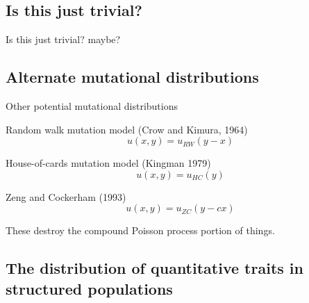 \documentclass{beamer}
\begin{document}
\subsection{Is this just trivial?}

\begin{frame}{Is this just trivial?}
  maybe?
\end{frame}

\subsection{Alternate mutational distributions}

\begin{frame}{Other potential mutational distributions}
  \begin{block}{Random walk mutation model (Crow and Kimura, 1964)}
    \begin{equation*}
      u(x,y) = u_{RW}(y-x)
    \end{equation*}
  \end{block}
  \begin{block}{House-of-cards mutation model (Kingman 1979)}    
    \begin{equation*}
      u(x,y) = u_{HC}(y)
    \end{equation*}
  \end{block}
  \begin{block}{Zeng and Cockerham (1993)}    
    \begin{equation*}
      u(x,y) = u_{ZC}(y - cx)
    \end{equation*}
  \end{block}
  These destroy the compound Poisson process portion of things.
\end{frame}

\subsection{The distribution of quantitative traits in structured populations}
\end{document}
